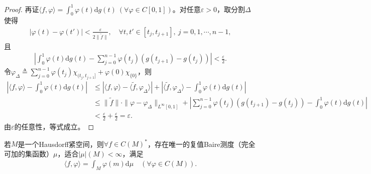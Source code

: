 \documentclass[../../main.tex]{subfiles}%
\begin{document}
\begin{proof}
再证$\langle f,\varphi\rangle=\int_{0}^{1}\varphi(t)\mathrm{d}g(t)\ (\forall\varphi\in C[0,1])$。对任意$\varepsilon>0$，取分割$\Delta$使得
\begin{align*}
|\varphi(t)-\varphi(t')|<\frac{\varepsilon}{2\|\widetilde{f}\|},\quad\forall t,t'\in[t_j,t_{j+1}],\ j=0,1,\cdots,n-1,
\end{align*}
且
\begin{align*}
\left|\int_{0}^{1}\varphi(t)\mathrm{d}g(t)-\sum\limits_{j=0}^{n-1}\varphi(t_j)(g(t_{j+1})-g(t_j))\right|<\frac{\varepsilon}{2}.
\end{align*}
令$\varphi_\Delta\triangleq\sum\limits_{j=0}^{n-1}\varphi(t_j)\chi_{(t_j,t_{j+1}]}+\varphi(0)\chi_{\{0\}}$，则
\begin{align*}
\left|\langle f,\varphi\rangle-\int_{0}^{1}\varphi(t)\mathrm{d}g(t)\right|
&\leqslant\left|\langle f,\varphi\rangle-\langle\widetilde{f},\varphi_\Delta\rangle\right|+\left|\langle\widetilde{f},\varphi_\Delta\rangle-\int_{0}^{1}\varphi(t)\mathrm{d}g(t)\right|\\
&\leqslant\|\widetilde{f}\|\cdot\|\varphi-\varphi_\Delta\|_{L^\infty[0,1]}+\left|\sum\limits_{j=0}^{n-1}\varphi(t_j)(g(t_{j+1})-g(t_j))-\int_{0}^{1}\varphi(t)\mathrm{d}g(t)\right|\\
&<\frac{\varepsilon}{2}+\frac{\varepsilon}{2}=\varepsilon.
\end{align*}
由$\varepsilon$的任意性，等式成立。
\end{proof}

\begin{theorem}\label{theorem:泛函分析--Riesz表示定理连续函数空间}
若$M$是一个Hausdorff紧空间，则$\forall f\in C(M)^*$，存在唯一的复值Baire测度（完全可加的集函数）$\mu$，适合$|\mu|(M)<\infty$，满足
\begin{align}
\langle f,\varphi\rangle = \int_{M}\varphi(m)\mathrm{d}\mu \quad (\forall \varphi\in C(M)).
\end{align}
\end{theorem}
\end{document}
